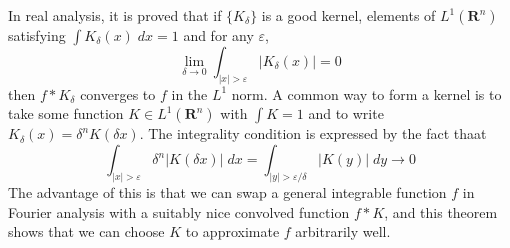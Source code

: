 In real analysis, it is proved that if $\{ K_\delta \}$ is a good kernel, elements of $L^1(\mathbf{R}^n)$ satisfying $\int K_\delta(x)\; dx = 1$ and for any $\varepsilon$,
%
\[ \lim_{\delta \to 0} \int_{|x| > \varepsilon} |K_\delta(x)| = 0 \]
%
then $f * K_\delta$ converges to $f$ in the $L^1$ norm. A common way to form a kernel is to take some function $K \in L^1(\mathbf{R}^n)$ with $\int K = 1$ and to write $K_\delta(x) = \delta^n K(\delta x)$. The integrality condition is expressed by the fact thaat
%
\[ \int_{|x| > \varepsilon} \delta^n |K(\delta x)|\; dx = \int_{|y| > \varepsilon/\delta} |K(y)|\; dy \to 0 \]
%
The advantage of this is that we can swap a general integrable function $f$ in Fourier analysis with a suitably nice convolved function $f * K$, and this theorem shows that we can choose $K$ to approximate $f$ arbitrarily well.

